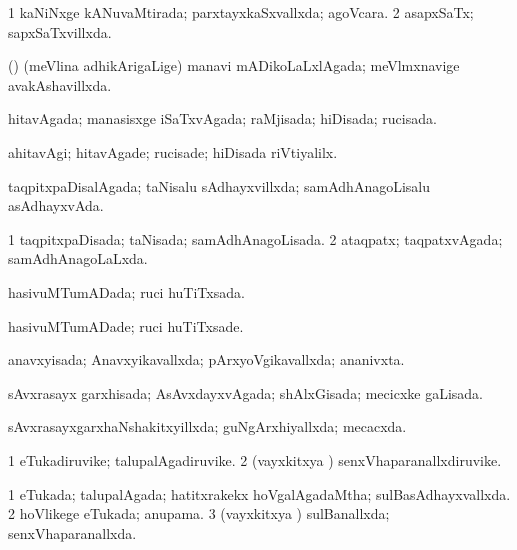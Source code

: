 {\bentry
{} 
\gl{\gu}
\expl{}
\bmng
\bnum
\num{1} kaNiNxge kANuvaMtirada; parxtayxkaSxvallxda; agoVcara. 
\num{2} asapxSaTx; sapxSaTxvillxda. 
\enum
\emng
\eentry

\bentry
{} 
\gl{\gu}
\expl{}
\bmng
(\nAyxshA) (meVlina adhikArigaLige) manavi mADikoLaLxlAgada; meVlmxnavige avakAshavillxda. 
\emng
\eentry

\bentry
{} 
\gl{\gu}
\expl{}
\bmng
hitavAgada; manasisxge iSaTxvAgada; raMjisada; hiDisada; rucisada. 
\emng
\eentry

\bentry
{} 
\gl{\kirxvi}
\expl{}
\bmng
ahitavAgi; hitavAgade; rucisade; hiDisada riVtiyalilx. 
\emng
\eentry

\bentry
{} 
\gl{\gu}
\expl{}
\bmng
taqpitxpaDisalAgada; taNisalu sAdhayxvillxda; samAdhAnagoLisalu asAdhayxvAda. 
\emng
\eentry

\bentry
{} 
\gl{\gu}
\expl{}
\bmng
\bnum
\num{1} taqpitxpaDisada; taNisada; samAdhAnagoLisada. 
\num{2} ataqpatx; taqpatxvAgada; samAdhAnagoLaLxda. 
\enum
\emng
\eentry

\bentry
{} 
\gl{\gu}
\expl{}
\bmng
hasivuMTumADada; ruci huTiTxsada. 
\emng
\eentry

\bentry
{} 
\gl{\kirxvi}
\expl{}
\bmng
hasivuMTumADade; ruci huTiTxsade. 
\emng
\eentry

\bentry
{} 
\gl{\gu}
\expl{}
\bmng
anavxyisada; Anavxyikavallxda; pArxyoVgikavallxda; ananivxta. 
\emng
\eentry

\bentry
{} 
\gl{\gu}
\expl{}
\bmng
sAvxrasayx garxhisada; AsAvxdayxvAgada; shAlxGisada; mecicxke gaLisada. 
\emng
\eentry

\bentry
{} 
\gl{\gu}
\expl{}
\bmng
sAvxrasayxgarxhaNshakitxyillxda; guNgArxhiyallxda; mecacxda. 
\emng
\eentry

\bentry
{} 
\gl{\nA}
\expl{}
\bmng
\bnum
\num{1} eTukadiruvike; talupalAgadiruvike. 
\num{2} (vayxkitxya \vi) senxVhaparanallxdiruvike. 
\enum
\emng
\eentry

\bentry
{} 
\gl{\gu}
\expl{}
\bmng
\bnum
\num{1} eTukada; talupalAgada; hatitxrakekx hoVgalAgadaMtha; sulBasAdhayxvallxda. 
\num{2} hoVlikege eTukada; anupama. 
\num{3} (vayxkitxya \vi) sulBanallxda; senxVhaparanallxda. 
\enum
\emng
\eentry

}
